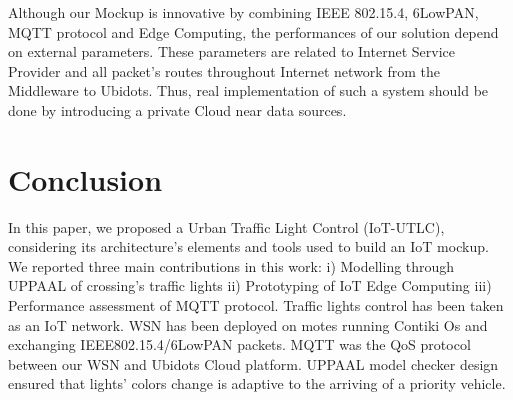  
Although our Mockup is innovative by combining IEEE 802.15.4, 6LowPAN, MQTT protocol and Edge Computing, the performances of our solution depend on external parameters.  These parameters are related to Internet Service Provider and all packet's routes throughout Internet network from the Middleware to Ubidots. Thus, real implementation of such a system should be done by introducing a private Cloud near data sources. 



\section{Conclusion} \label{Sec:Conclusion}

In this paper, we proposed a Urban Traffic Light Control (IoT-UTLC), considering its architecture’s elements and tools used to build an IoT mockup.
We reported three main contributions in this work: i) Modelling through UPPAAL of crossing's traffic lights ii) Prototyping of IoT Edge Computing  iii) Performance assessment of MQTT protocol. Traffic lights control has been taken as an IoT network. WSN has been deployed on motes running Contiki Os and exchanging IEEE802.15.4/6LowPAN packets. MQTT was the QoS protocol between our WSN and Ubidots Cloud platform. UPPAAL model checker design ensured that lights' colors change is adaptive to the arriving of a priority vehicle.

